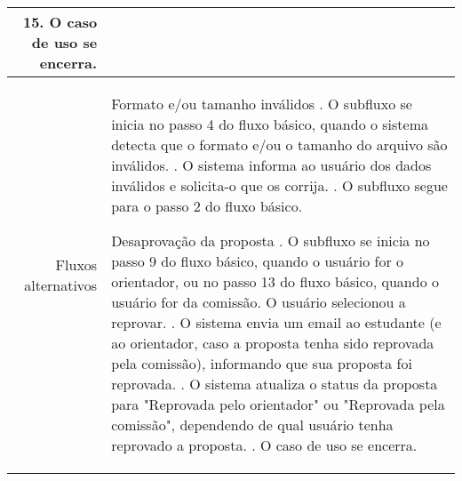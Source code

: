 \begin{longtable}{r p{12cm}}
                15. O caso de uso se encerra.    \newline
               \\ \hline
Fluxos alternativos & Formato e/ou tamanho inválidos \newline
                        1. O subfluxo se inicia no passo 4 do fluxo básico, quando o sistema detecta que o formato e/ou o tamanho do arquivo são inválidos. \newline
                        2. O sistema informa ao usuário dos dados inválidos e solicita-o que os corrija. \newline
                        3. O subfluxo segue para o passo 2 do fluxo básico. \newline
                    
                    Desaprovação da proposta \newline
                        1. O subfluxo se inicia no passo 9 do fluxo básico, quando o usuário for o orientador, ou no passo 13 do fluxo básico, quando o usuário for da comissão. O usuário selecionou a reprovar. \newline
                        2. O sistema envia um email ao estudante (e ao orientador, caso a proposta tenha sido reprovada pela comissão), informando que sua proposta foi reprovada. \newline
                        3. O sistema atualiza o status da proposta para "Reprovada pelo orientador" ou "Reprovada pela comissão", dependendo de qual usuário tenha reprovado a proposta. \newline
                        4. O caso de uso se encerra. \newline
                    \\ \hline        
\end{longtable}





